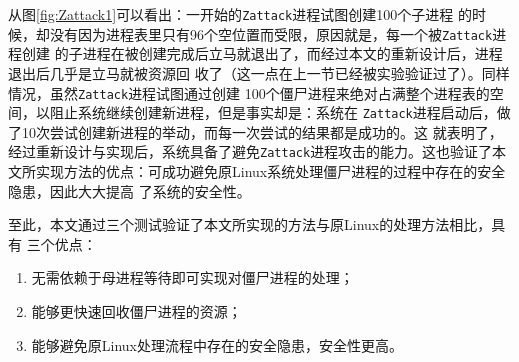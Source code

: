 \documentclass{swfuthesism}
\begin{document}
从图\ref{fig:Zattack1}可以看出：一开始的\texttt{Zattack}进程试图创建100个子进程
的时候，却没有因为进程表里只有96个空位置而受限，原因就是，每一个被\texttt{Zattack}进程创建
的子进程在被创建完成后立马就退出了，而经过本文的重新设计后，进程退出后几乎是立马就被资源回
收了（这一点在上一节已经被实验验证过了）。同样情况，虽然\texttt{Zattack}进程试图通过创建
100个僵尸进程来绝对占满整个进程表的空间，以阻止系统继续创建新进程，但是事实却是：系统在
\texttt{Zattack}进程启动后，做了10次尝试创建新进程的举动，而每一次尝试的结果都是成功的。这
就表明了，经过重新设计与实现后，系统具备了避免\texttt{Zattack}进程攻击的能力。这也验证了本
文所实现方法的优点：可成功避免原Linux系统处理僵尸进程的过程中存在的安全隐患，因此大大提高
了系统的安全性。

至此，本文通过三个测试验证了本文所实现的方法与原Linux的处理方法相比，具有
三个优点：
\begin{enumerate}
\item 无需依赖于母进程等待即可实现对僵尸进程的处理；
\item 能够更快速回收僵尸进程的资源；
\item 能够避免原Linux处理流程中存在的安全隐患，安全性更高。
\end{enumerate}


\end{document}
